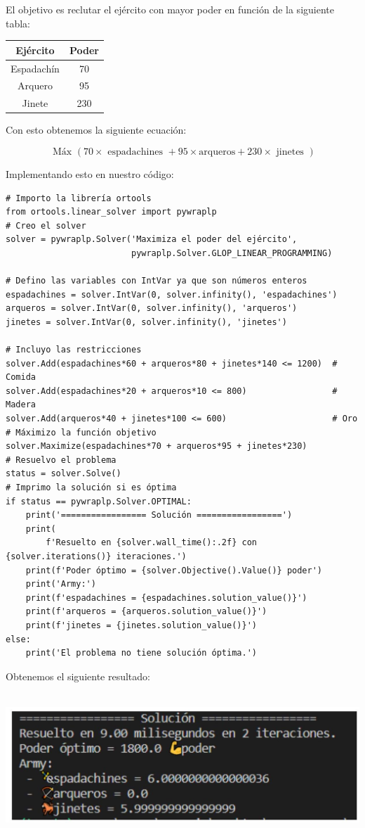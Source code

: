 \documentclass[10pt]{article}
\begin{document}
El objetivo es reclutar el ejército con mayor poder en función de la siguiente tabla:

\begin{center}
\begin{tabular}{|c|c|}
\hline
Ejército & Poder \\
\hline
Espadachín & 70 \\
\hline
Arquero & 95 \\
\hline
Jinete & 230 \\
\hline
\end{tabular}
\end{center}

Con esto obtenemos la siguiente ecuación:

$$
\text { Máx }(70 \times \text { espadachines }+95 \times \text {arqueros}+230 \times \text { jinetes })
$$

Implementando esto en nuestro código:

\begin{verbatim}
# Importo la librería ortools
from ortools.linear_solver import pywraplp
# Creo el solver
solver = pywraplp.Solver('Maximiza el poder del ejército',
                         pywraplp.Solver.GLOP_LINEAR_PROGRAMMING)

# Defino las variables con IntVar ya que son números enteros
espadachines = solver.IntVar(0, solver.infinity(), 'espadachines')
arqueros = solver.IntVar(0, solver.infinity(), 'arqueros')
jinetes = solver.IntVar(0, solver.infinity(), 'jinetes')

# Incluyo las restricciones
solver.Add(espadachines*60 + arqueros*80 + jinetes*140 <= 1200)  # Comida
solver.Add(espadachines*20 + arqueros*10 <= 800)                 # Madera
solver.Add(arqueros*40 + jinetes*100 <= 600)                     # Oro
# Máximizo la función objetivo
solver.Maximize(espadachines*70 + arqueros*95 + jinetes*230)
# Resuelvo el problema
status = solver.Solve()
# Imprimo la solución si es óptima
if status == pywraplp.Solver.OPTIMAL:
    print('================= Solución =================')
    print(
        f'Resuelto en {solver.wall_time():.2f} con {solver.iterations()} iteraciones.')
    print(f'Poder óptimo = {solver.Objective().Value()} poder')
    print('Army:')
    print(f'espadachines = {espadachines.solution_value()}')
    print(f'arqueros = {arqueros.solution_value()}')
    print(f'jinetes = {jinetes.solution_value()}')
else:
    print('El problema no tiene solución óptima.')
\end{verbatim}
\newpage
Obtenemos el siguiente resultado:\\
\\
\begin{center}
\includegraphics[max width=\textwidth]{images/solucion.jpg}
\end{center}
\end{document}
